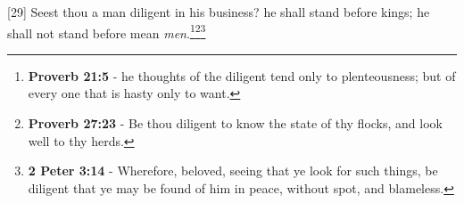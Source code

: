 [29] \textcolor[cmyk]{0.99998,1,0,0}{Seest thou a man diligent in his business? he shall stand before kings; he shall not stand before mean \emph{men}.}\footnote{\textbf{Proverb 21:5} - he thoughts of the diligent tend only to plenteousness; but of every one that is hasty only to want.}\footnote{\textbf{Proverb 27:23} - Be thou diligent to know the state of thy flocks, and look well to thy herds.}\footnote{\textbf{2 Peter 3:14} - Wherefore, beloved, seeing that ye look for such things, be diligent that ye may be found of him in peace, without spot, and blameless.}



